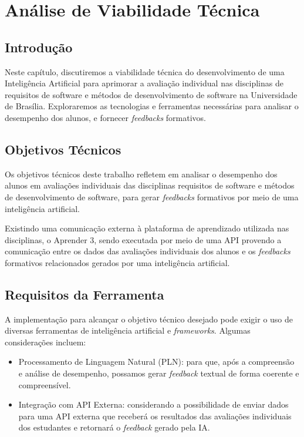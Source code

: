 \chapter{Análise de Viabilidade Técnica}

\section{Introdução}

Neste capítulo, discutiremos a viabilidade técnica do desenvolvimento de uma Inteligência Artificial para aprimorar a avaliação individual nas disciplinas de requisitos de software e métodos de desenvolvimento de software na Universidade de Brasília. Exploraremos as tecnologias e ferramentas necessárias para analisar o desempenho dos alunos, e fornecer \textit{feedbacks} formativos.

\section{Objetivos Técnicos}

Os objetivos técnicos deste trabalho refletem em analisar o desempenho dos alunos em avaliações individuais das disciplinas requisitos de software e métodos de desenvolvimento de software, para gerar \textit{feedbacks} formativos por meio de uma inteligência artificial.

Existindo uma comunicação externa à plataforma de aprendizado utilizada nas disciplinas, o Aprender 3, sendo executada por meio de uma API provendo a comunicação entre os dados das avaliações individuais dos alunos e os \textit{feedbacks} formativos relacionados gerados por uma inteligência artificial.

\section{Requisitos da Ferramenta}

A implementação para alcançar o objetivo técnico desejado pode exigir o uso de diversas ferramentas de inteligência artificial e \textit{frameworks}. Algumas considerações incluem:

\begin{itemize}
  \item Processamento de Linguagem Natural (PLN): para que, após a compreensão e análise de desempenho, possamos gerar \textit{feedback} textual de forma coerente e compreensível.
  \item Integração com API Externa: considerando a possibilidade de enviar dados para uma API externa que receberá os resultados das avaliações individuais dos estudantes e retornará o \textit{feedback} gerado pela IA.
\end{itemize}

